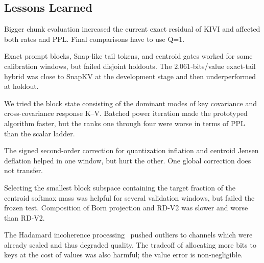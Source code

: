 \documentclass[10pt,twocolumn]{article}
\newcommand{\bpv}{bits/value}
\begin{document}
\subsection{Lessons Learned}
\label{sec:negative}

\begin{paragraph}
Bigger chunk evaluation increased the current exact residual of KIVI and affected both rates and PPL. Final comparisons have to use Q=1.

\end{paragraph}

\begin{paragraph}
Exact prompt blocks, Snap-like tail tokens, and centroid gates worked for some calibration windows, but failed disjoint holdouts. The $2.061$-\bpv{} exact-tail hybrid was close to SnapKV at the development stage and then underperformed at holdout.

\end{paragraph}

\begin{paragraph}
We tried the block state consisting of the dominant modes of key covariance and cross-covariance response K--V. Batched power iteration made the prototyped algorithm faster, but the ranks one through four were worse in terms of PPL than the scalar ladder.

\end{paragraph}

\begin{paragraph}
The signed second-order correction for quantization inflation and centroid Jensen deflation helped in one window, but hurt the other. One global correction does not transfer.

\end{paragraph}

\begin{paragraph}
Selecting the smallest block subspace containing the target fraction of the centroid softmax mass was helpful for several validation windows, but failed the frozen test. Composition of Born projection and RD-V2 was slower and worse than RD-V2.

\end{paragraph}

\begin{paragraph}
The Hadamard incoherence processing~\cite{tseng2024quip,ashkboos2024quarot} pushed outliers to channels which were already scaled and thus degraded quality. The tradeoff of allocating more bits to keys at the cost of values was also harmful; the value error is non-negligible.

\end{paragraph}
\end{document}
